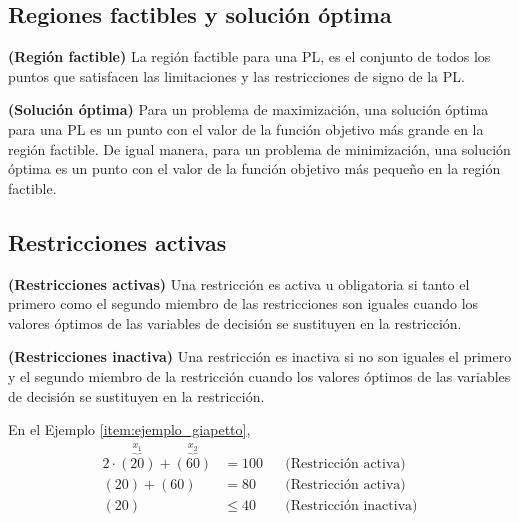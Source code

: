 \documentclass[../main.tex]{subfiles}
\begin{document}
    \subsection{Regiones factibles y solución óptima}
        \begin{definition} \textbf{(Región factible)}
            La región factible para una PL, es el conjunto de todos los puntos que satisfacen las limitaciones y las restricciones de signo de la PL.
        \end{definition}

        \begin{definition} \textbf{(Solución óptima)}
            Para un problema de maximización, una solución óptima para una PL es un punto con el valor de la función objetivo más grande en la región factible. De igual manera, para un problema de minimización, una solución óptima es un punto con el valor de la función objetivo más pequeño en la región factible.
        \end{definition}

    \subsection{Restricciones activas}
        \begin{definition} \textbf{(Restricciones activas)}
            Una restricción es activa u obligatoria si tanto el primero como el segundo miembro de las restricciones son iguales cuando los valores óptimos de las variables de decisión se sustituyen en la restricción.
        \end{definition}

        \begin{definition} \textbf{(Restricciones inactiva)}
            Una restricción es inactiva si no son iguales el primero y el segundo miembro de la restricción cuando los valores óptimos de las variables de decisión se sustituyen en la restricción.
        \end{definition}

        En el Ejemplo \ref{item:ejemplo_giapetto}, 
        \begin{equation}
            \begin{aligned}
            2 \cdot \overset{\underbrace{x_1}}{(20)} + \overset{\underbrace{x_2}}{(60)} &= 100  && \text{(Restricción activa)}\\
            (20) + (60) &= 80 && \text{(Restricción activa)}\\
            (20) &\leq 40 && \text{(Restricción inactiva)}
            \end{aligned}
        \end{equation}
\end{document}
